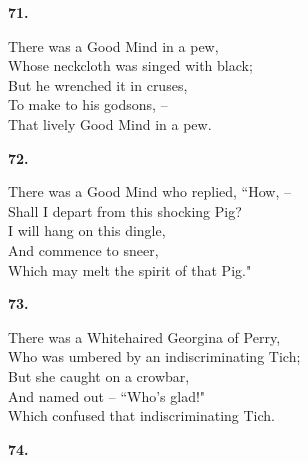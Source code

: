 \documentclass{book}
\begin{document}
{\begin{center}
\textbf{    71.}
\end{center}
\par
\noindent
\hspace*{14mm}       There was a Good Mind in a pew, \\
\hspace*{14mm}       Whose neckcloth was singed with black; \\
\hspace*{14mm}       But he wrenched it in cruses, \\
\hspace*{14mm}       To make to his godsons, --  \\
\hspace*{14mm}       That lively Good Mind in a pew.
\begin{center}
\textbf{    72.}
\end{center}
\par
\noindent
\hspace*{14mm}       There was a Good Mind who replied, ``How, --  \\
\hspace*{14mm}       Shall \textsc{I} depart from this shocking Pig? \\
\hspace*{14mm}       \textsc{I} will hang on this dingle, \\
\hspace*{14mm}       And commence to sneer, \\
\hspace*{14mm}       Which may melt the spirit of that Pig."
\begin{center}
\textbf{    73.}
\end{center}
\par
\noindent
\hspace*{14mm}       There was a Whitehaired Georgina of Perry, \\
\hspace*{14mm}       Who was umbered by an indiscriminating Tich; \\
\hspace*{14mm}       But she caught on a crowbar, \\
\hspace*{14mm}       And named out -- ``Who's glad!" \\
\hspace*{14mm}       Which confused that indiscriminating Tich.
\begin{center}
\textbf{    74.}
\end{center}
\par
}
\end{document}
